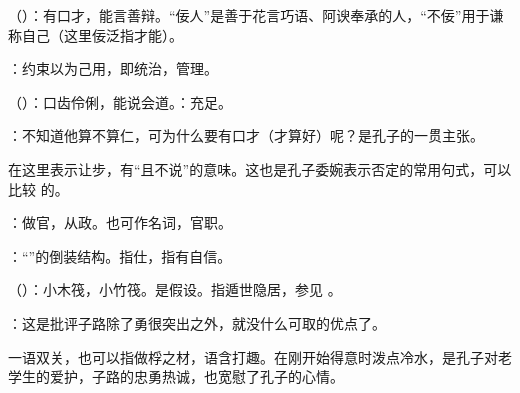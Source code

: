 {
\item {}（）：有口才，能言善辩。“佞人”是善于花言巧语、阿谀奉承的人，“不佞”用于谦称自己（这里佞泛指才能）。
\item {}：约束以为己用，即统治，管理。
\item {}（）：口齿伶俐，能说会道。：充足。
\item {}：不知道他算不算仁，可为什么要有口才（才算好）呢？是孔子的一贯主张。

在这里表示让步，有“且不说”的意味。这也是孔子委婉表示否定的常用句式，可以比较  的。
}
{}


{
\item {}：做官，从政。也可作名词，官职。

\item {}：“”的倒装结构。指仕，指有自信。
}
{}


{
\item {}（）：小木筏，小竹筏。是假设。指遁世隐居，参见 。
\item {}：这是批评子路除了勇很突出之外，就没什么可取的优点了。

一语双关，也可以指做桴之材，语含打趣。在刚开始得意时泼点冷水，是孔子对老学生的爱护，子路的忠勇热诚，也宽慰了孔子的心情。
}
{}


